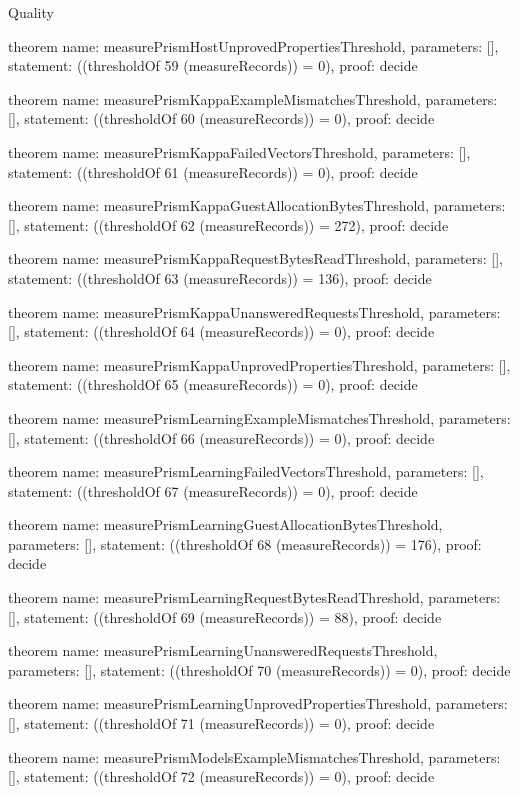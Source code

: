 \begin{lexlean}{Quality}
\begin{semanticmodule}
theorem{
  name: measurePrismHostUnprovedPropertiesThreshold,
  parameters: [],
  statement: ((thresholdOf 59 (measureRecords)) = 0),
  proof: decide{}
}

theorem{
  name: measurePrismKappaExampleMismatchesThreshold,
  parameters: [],
  statement: ((thresholdOf 60 (measureRecords)) = 0),
  proof: decide{}
}

theorem{
  name: measurePrismKappaFailedVectorsThreshold,
  parameters: [],
  statement: ((thresholdOf 61 (measureRecords)) = 0),
  proof: decide{}
}

theorem{
  name: measurePrismKappaGuestAllocationBytesThreshold,
  parameters: [],
  statement: ((thresholdOf 62 (measureRecords)) = 272),
  proof: decide{}
}

theorem{
  name: measurePrismKappaRequestBytesReadThreshold,
  parameters: [],
  statement: ((thresholdOf 63 (measureRecords)) = 136),
  proof: decide{}
}

theorem{
  name: measurePrismKappaUnansweredRequestsThreshold,
  parameters: [],
  statement: ((thresholdOf 64 (measureRecords)) = 0),
  proof: decide{}
}

theorem{
  name: measurePrismKappaUnprovedPropertiesThreshold,
  parameters: [],
  statement: ((thresholdOf 65 (measureRecords)) = 0),
  proof: decide{}
}

theorem{
  name: measurePrismLearningExampleMismatchesThreshold,
  parameters: [],
  statement: ((thresholdOf 66 (measureRecords)) = 0),
  proof: decide{}
}

theorem{
  name: measurePrismLearningFailedVectorsThreshold,
  parameters: [],
  statement: ((thresholdOf 67 (measureRecords)) = 0),
  proof: decide{}
}

theorem{
  name: measurePrismLearningGuestAllocationBytesThreshold,
  parameters: [],
  statement: ((thresholdOf 68 (measureRecords)) = 176),
  proof: decide{}
}

theorem{
  name: measurePrismLearningRequestBytesReadThreshold,
  parameters: [],
  statement: ((thresholdOf 69 (measureRecords)) = 88),
  proof: decide{}
}

theorem{
  name: measurePrismLearningUnansweredRequestsThreshold,
  parameters: [],
  statement: ((thresholdOf 70 (measureRecords)) = 0),
  proof: decide{}
}

theorem{
  name: measurePrismLearningUnprovedPropertiesThreshold,
  parameters: [],
  statement: ((thresholdOf 71 (measureRecords)) = 0),
  proof: decide{}
}

theorem{
  name: measurePrismModelsExampleMismatchesThreshold,
  parameters: [],
  statement: ((thresholdOf 72 (measureRecords)) = 0),
  proof: decide{}
}


\end{semanticmodule}
\end{lexlean}
